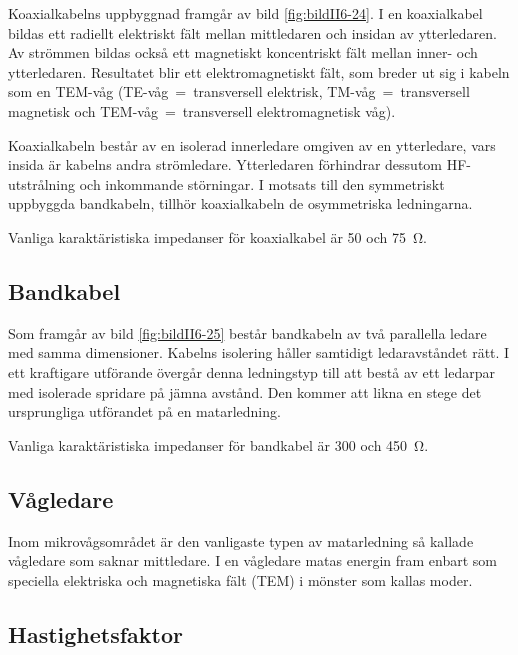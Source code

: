 Koaxialkabelns uppbyggnad framgår av bild \ref{fig:bildII6-24}.
I en koaxialkabel bildas ett radiellt elektriskt fält mellan mittledaren och
insidan av ytterledaren.
Av strömmen bildas också ett magnetiskt koncentriskt fält mellan inner- och
ytterledaren.
Resultatet blir ett elektromagnetiskt fält, som breder ut sig i kabeln som en
TEM-våg (TE-våg~=~transversell elektrisk, TM-våg~=~transversell magnetisk och
TEM-våg~=~transversell elektromagnetisk våg).

Koaxialkabeln består av en isolerad innerledare omgiven av en ytterledare, vars
insida är kabelns andra strömledare.
Ytterledaren förhindrar dessutom HF-utstrålning och inkommande störningar.
I motsats till den symmetriskt uppbyggda bandkabeln, tillhör
koaxialkabeln de osymmetriska ledningarna.

Vanliga karaktäristiska impedanser för koaxialkabel är 50 och \SI{75}{\ohm}.

\subsection{Bandkabel}


Som framgår av bild \ref{fig:bildII6-25} består bandkabeln av två parallella
ledare med samma dimensioner.
Kabelns isolering håller samtidigt ledaravståndet rätt.
I ett kraftigare utförande övergår denna ledningstyp till att bestå av ett
ledarpar med isolerade spridare på jämna avstånd.
Den kommer att likna en stege det ursprungliga utförandet på en matarledning.

Vanliga karaktäristiska impedanser för bandkabel är 300 och \SI{450}{\ohm}.

\subsection{Vågledare}

Inom mikrovågsområdet är den vanligaste typen av matarledning så kallade
vågledare som saknar mittledare.
I en vågledare matas energin fram enbart som speciella elektriska och
magnetiska fält (TEM) i mönster som kallas moder.

\subsection{Hastighetsfaktor}

